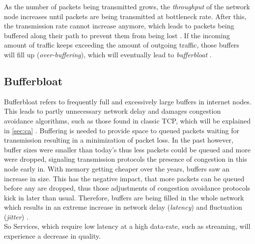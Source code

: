 \documentclass[a4paper,conference]{IEEEtran}
\begin{document}
As the number of packets being transmitted grows, the \textit{throughput} of the network node increases until packets are being transmitted at bottleneck rate. After this, the transmission rate cannot increase anymore, which leads to packets being buffered along their path to prevent them from being lost \cite{gettys2012bufferbloat}. If the incoming amount of traffic keeps exceeding the amount of outgoing traffic, those buffers will fill up (\textit{over-buffering}), which will eventually lead to \textit{bufferbloat} \cite{Allman13commentson,6886125}.

\subsection*{Bufferbloat}
Bufferbloat refers to frequently full and excessively large buffers in internet nodes. This leads to partly unnecessary network delay and damages congestion avoidance algorithms, such as those found in classic TCP, which will be explained in  \autoref{sec:ca} \cite{gettys2012bufferbloat,chen2014bufferbloat}. Buffering is needed to provide space to queued packets waiting for transmission resulting in a minimization of packet loss. In the past however, buffer sizes were smaller than today's thus less packets could be queued and more were dropped, signaling transmission protocols the presence of congestion in this node early in. With memory getting cheaper over the years, buffers saw an increase in size. This has the negative impact, that more packets can be queued before any are dropped, thus those adjustments of congestion avoidance protocols kick in later than usual. Therefore, buffers are being filled in the whole network which results in an extreme increase in network delay (\textit{latency}) and fluctuation (\textit{jitter}) \cite{gettys2012bufferbloat,staff2012bufferbloat,chen2014bufferbloat}.
\\So Services, which require low latency at a high data-rate, such as streaming, will experience a decrease in quality.
\end{document}
